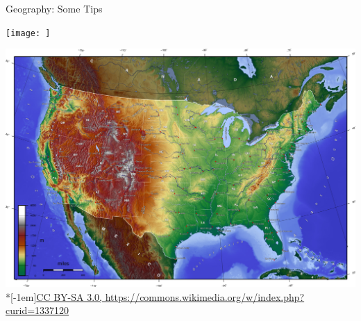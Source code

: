 \begin{frame}[fragile]{Geography: Some Tips}
    \begin{minipage}{0.47\textwidth}
        \texttt{[image: ]}
    \end{minipage}
    \hspace{0.05\textwidth}
    \begin{minipage}{0.47\textwidth}\end{minipage}
    \begin{center}
        \includegraphics[width=\textwidth]{USA_topo_en}\\*[-1em]\hfill{\tiny \href{https://commons.wikimedia.org/w/index.php?curid=1337120}{CC BY-SA 3.0, https://commons.wikimedia.org/w/index.php?curid=1337120}}
    \end{center}
\end{frame}

